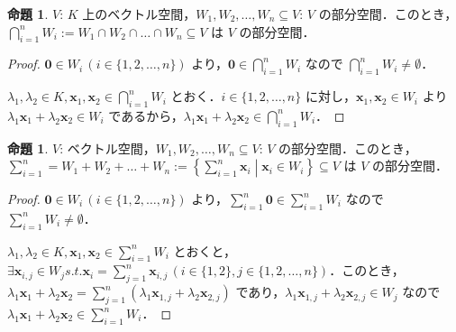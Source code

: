 \documentclass{jlreq}
\theoremstyle{definition}
\newtheorem{prop}[thm]{命題}
\newcommand{\relmiddle}[1]{\mathrel{}\middle#1\mathrel{}}
\begin{document}
      \begin{prop}
        $V$: $K$ 上のベクトル空間，$W_1, W_2, \dots, W_n \subseteq V$: $V$ の部分空間．このとき，$\bigcap_{i=1}^n W_i := W_1 \cap W_2 \cap \dots \cap W_n \subseteq V$ は $V$ の部分空間．
      \end{prop}
      \begin{proof}
        $\bm{0} \in W_i \, (i \in \{1,2,\dots,n\})$ より，$\bm{0} \in \bigcap_{i=1}^n W_i$ なので $\bigcap_{i=1}^n W_i \neq \emptyset$．

        $\lambda_1,\lambda_2 \in K, \bm{x}_1,\bm{x}_2 \in \bigcap_{i=1}^n W_i$ とおく．$i \in \{1,2,\dots,n\}$ に対し，$\bm{x}_1,\bm{x}_2 \in W_i$ より $\lambda_1\bm{x}_1+\lambda_2\bm{x}_2 \in W_i$ であるから，$\lambda_1\bm{x}_1+\lambda_2\bm{x}_2 \in \bigcap_{i=1}^n W_i$．
      \end{proof}
      \begin{prop}
        $V$: ベクトル空間，$W_1, W_2, \dots, W_n \subseteq V$: $V$ の部分空間．このとき，$\sum_{i=1}^n = W_1 + W_2 + \dots + W_n := \left\{\sum_{i=1}^n\bm{x}_i \relmiddle| \bm{x}_i \in W_i\right\} \subseteq V$ は $V$ の部分空間．
      \end{prop}
      \begin{proof}
        $\bm{0} \in W_i \, (i \in \{1,2,\dots,n\})$ より，$\sum_{i=1}^n\bm{0} \in \sum_{i=1}^n W_i$ なので $\sum_{i=1}^n W_i \neq \emptyset$．

        $\lambda_1,\lambda_2 \in K, \bm{x}_1,\bm{x}_2 \in \sum_{i=1}^n W_i$ とおくと，$\exists \bm{x}_{i,j} \in W_j s.t. \bm{x}_i=\sum_{j=1}^n\bm{x}_{i,j} \, (i \in \{1,2\}, j \in \{1,2,\dots,n\})$．このとき，$\lambda_1\bm{x}_1+\lambda_2\bm{x}_2=\sum_{j=1}^n(\lambda_1\bm{x}_{1,j}+\lambda_2\bm{x}_{2,j})$ であり，$\lambda_1\bm{x}_{1,j}+\lambda_2\bm{x}_{2,j} \in W_j$ なので $\lambda_1\bm{x}_1+\lambda_2\bm{x}_2 \in \sum_{i=1}^n W_i$．
      \end{proof}
\end{document}
